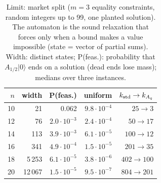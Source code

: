 \begin{table}[t]\centering\small\setlength{\tabcolsep}{4pt}
\caption{ Limit: market split ($m=3$ equality constraints, random integers up to 99, one planted solution). The automaton is the sound relaxation that forces only when a bound makes a value impossible (state = vector of partial sums). Width: distinct states; P(feas.): probability that $A_{1/2}|0\rangle$ ends on a solution (dead ends lose mass); medians over three instances.}\label{tab:gen_limits}
\begin{tabular}{rrrrr}\toprule
$n$ & width & P(feas.) & uniform & $k_{\rm std}\to k_{A_q}$\\\midrule
10 & 21 & 0.062 & $9.8\!\cdot\!10^{-4}$ & $25\to3$\\
12 & 76 & $2.0\!\cdot\!10^{-3}$ & $2.4\!\cdot\!10^{-4}$ & $50\to17$\\
14 & 113 & $3.9\!\cdot\!10^{-3}$ & $6.1\!\cdot\!10^{-5}$ & $100\to12$\\
16 & 341 & $4.9\!\cdot\!10^{-4}$ & $1.5\!\cdot\!10^{-5}$ & $201\to35$\\
18 & 5\,253 & $6.1\!\cdot\!10^{-5}$ & $3.8\!\cdot\!10^{-6}$ & $402\to100$\\
20 & 12\,067 & $1.5\!\cdot\!10^{-5}$ & $9.5\!\cdot\!10^{-7}$ & $804\to201$\\
\bottomrule\end{tabular}\end{table}
